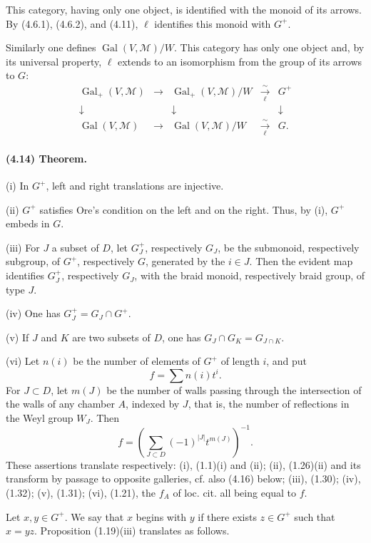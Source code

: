 \documentclass[10pt]{article}
\begin{document}
This category, having only one object, is identified with the monoid of its arrows. By (4.6.1), (4.6.2), and (4.11), \(\ell\) identifies this monoid with \(G^+\).

Similarly one defines \(\operatorname{Gal}(V,\mathcal M)/W\). This category has only one object and, by its universal property, \(\ell\) extends to an isomorphism from the group of its arrows to \(G\):
\[
\begin{array}{ccccc}
\operatorname{Gal}_+(V,\mathcal M)&\longrightarrow&
\operatorname{Gal}_+(V,\mathcal M)/W&\xrightarrow[\ell]{\sim}&G^+\\
\downarrow&&\downarrow&&\downarrow\\
\operatorname{Gal}(V,\mathcal M)&\longrightarrow&
\operatorname{Gal}(V,\mathcal M)/W&\xrightarrow[\ell]{\sim}&G .
\end{array}
\]

\paragraph{(4.14) Theorem.} (i) In \(G^+\), left and right translations are injective.

(ii) \(G^+\) satisfies Ore's condition on the left and on the right. Thus, by (i), \(G^+\) embeds in \(G\).

(iii) For \(J\) a subset of \(D\), let \(G_J^+\), respectively \(G_J\), be the submonoid, respectively subgroup, of \(G^+\), respectively \(G\), generated by the \(i\in J\). Then the evident map identifies \(G_J^+\), respectively \(G_J\), with the braid monoid, respectively braid group, of type \(J\).

(iv) One has \(G_J^+=G_J\cap G^+\).

(v) If \(J\) and \(K\) are two subsets of \(D\), one has \(G_J\cap G_K=G_{J\cap K}\).

(vi) Let \(n(i)\) be the number of elements of \(G^+\) of length \(i\), and put
\[
f=\sum n(i)t^i.
\]
For \(J\subset D\), let \(m(J)\) be the number of walls passing through the intersection of the walls of any chamber \(A\), indexed by \(J\), that is, the number of reflections in the Weyl group \(W_J\). Then
\[
f=\left(\sum_{J\subset D}(-1)^{|J|}t^{m(J)}\right)^{-1}.
\]
These assertions translate respectively: (i), (1.1)(i) and (ii); (ii), (1.26)(ii) and its transform by passage to opposite galleries, cf. also (4.16) below; (iii), (1.30); (iv), (1.32); (v), (1.31); (vi), (1.21), the \(f_A\) of loc. cit. all being equal to \(f\).

Let \(x,y\in G^+\). We say that \(x\) begins with \(y\) if there exists \(z\in G^+\) such that \(x=yz\). Proposition (1.19)(iii) translates as follows.
\end{document}

